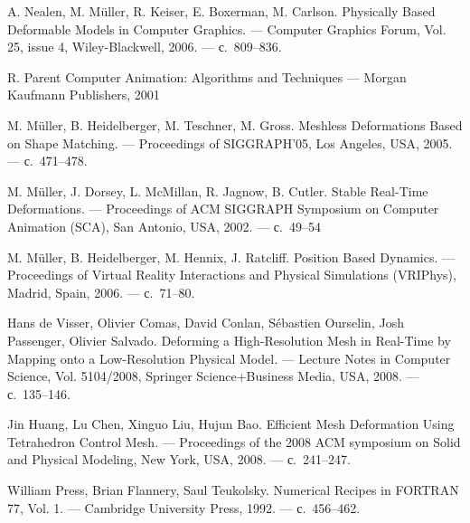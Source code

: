 \documentclass[a4paper,11pt]{report}
\begin{document}
  \begin{thebibliography}{99}

      A. Nealen, M. Müller, R. Keiser, E. Boxerman, M. Carlson.
      \newblock Physically Based Deformable Models in Computer Graphics.
      \newblock --- Computer Graphics Forum, Vol. 25, issue 4, Wiley-Blackwell, 2006.
      \newblock --- с.~809--836.

      R. Parent
      \newblock Computer Animation: Algorithms and Techniques
      \newblock --- Morgan Kaufmann Publishers, 2001

      M. Müller, B. Heidelberger, M. Teschner, M. Gross.
      \newblock Meshless Deformations Based on Shape Matching.
      \newblock --- Proceedings of SIGGRAPH'05, Los Angeles, USA, 2005.
      \newblock --- с.~471--478.

      M. Müller, J. Dorsey, L. McMillan, R. Jagnow, B. Cutler.
      \newblock Stable Real-Time Deformations.
      \newblock --- Proceedings of ACM SIGGRAPH Symposium on Computer Animation (SCA), San Antonio,
                    USA, 2002.
      \newblock --- с.~49--54

      M. Müller, B. Heidelberger, M. Hennix, J. Ratcliff.
      \newblock Position Based Dynamics.
      \newblock --- Proceedings of Virtual Reality Interactions and Physical Simulations (VRIPhys),
                    Madrid, Spain, 2006.
      \newblock --- с.~71--80.

      Hans de Visser, Olivier Comas, David Conlan, Sébastien Ourselin, Josh Passenger, Olivier Salvado.
      \newblock Deforming a High-Resolution Mesh in Real-Time by Mapping onto a Low-Resolution Physical Model.
      \newblock --- Lecture Notes in Computer Science, Vol. 5104/2008, Springer Science+Business Media,
                    USA, 2008.
      \newblock --- с.~135--146.

      Jin Huang, Lu Chen, Xinguo Liu, Hujun Bao.
      \newblock Efficient Mesh Deformation Using Tetrahedron Control Mesh.
      \newblock --- Proceedings of the 2008 ACM symposium on Solid and Physical Modeling, New York,
                    USA, 2008.
      \newblock --- с.~241--247.

      William Press, Brian Flannery, Saul Teukolsky.
      \newblock Numerical Recipes in FORTRAN 77, Vol. 1.
      \newblock --- Cambridge University Press, 1992.
      \newblock --- с.~456--462.


\end{thebibliography}
\end{document}
